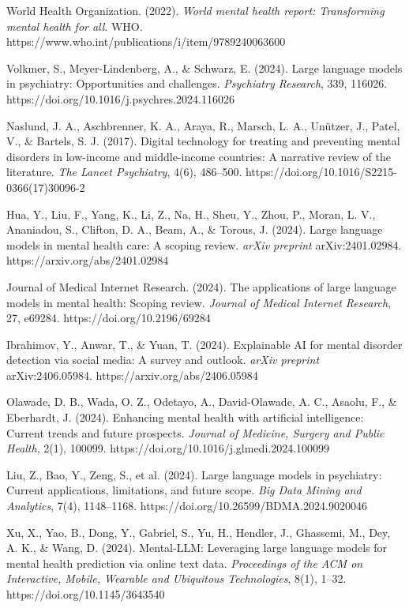 \documentclass[sn-basic,authoryear]{sn-jnl}
\begin{document}
\begin{thebibliography}{99}

World Health Organization. (2022). \textit{World mental health report: Transforming mental health for all}. WHO. https://www.who.int/publications/i/item/9789240063600

Volkmer, S., Meyer-Lindenberg, A., \& Schwarz, E. (2024). Large language models in psychiatry: Opportunities and challenges. \textit{Psychiatry Research}, 339, 116026. https://doi.org/10.1016/j.psychres.2024.116026

Naslund, J. A., Aschbrenner, K. A., Araya, R., Marsch, L. A., Unützer, J., Patel, V., \& Bartels, S. J. (2017). Digital technology for treating and preventing mental disorders in low-income and middle-income countries: A narrative review of the literature. \textit{The Lancet Psychiatry}, 4(6), 486–500. https://doi.org/10.1016/S2215-0366(17)30096-2

Hua, Y., Liu, F., Yang, K., Li, Z., Na, H., Sheu, Y., Zhou, P., Moran, L. V., Ananiadou, S., Clifton, D. A., Beam, A., \& Torous, J. (2024). Large language models in mental health care: A scoping review. \textit{arXiv preprint} arXiv:2401.02984. https://arxiv.org/abs/2401.02984

Journal of Medical Internet Research. (2024). The applications of large language models in mental health: Scoping review. \textit{Journal of Medical Internet Research}, 27, e69284. https://doi.org/10.2196/69284

Ibrahimov, Y., Anwar, T., \& Yuan, T. (2024). Explainable AI for mental disorder detection via social media: A survey and outlook. \textit{arXiv preprint} arXiv:2406.05984. https://arxiv.org/abs/2406.05984

Olawade, D. B., Wada, O. Z., Odetayo, A., David-Olawade, A. C., Asaolu, F., \& Eberhardt, J. (2024). Enhancing mental health with artificial intelligence: Current trends and future prospects. \textit{Journal of Medicine, Surgery and Public Health}, 2(1), 100099. https://doi.org/10.1016/j.glmedi.2024.100099

Liu, Z., Bao, Y., Zeng, S., et al. (2024). Large language models in psychiatry: Current applications, limitations, and future scope. \textit{Big Data Mining and Analytics}, 7(4), 1148–1168. https://doi.org/10.26599/BDMA.2024.9020046

Xu, X., Yao, B., Dong, Y., Gabriel, S., Yu, H., Hendler, J., Ghassemi, M., Dey, A. K., \& Wang, D. (2024). Mental-LLM: Leveraging large language models for mental health prediction via online text data. \textit{Proceedings of the ACM on Interactive, Mobile, Wearable and Ubiquitous Technologies}, 8(1), 1–32. https://doi.org/10.1145/3643540


\end{thebibliography}
\end{document}
